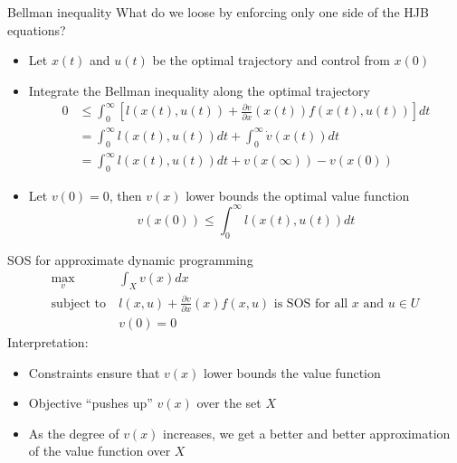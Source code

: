 \documentclass[aspectratio=169]{beamer}
\begin{document}
\begin{frame}{Bellman inequality}
What do we loose by enforcing only one side of the HJB equations?
\begin{itemize}
\item
Let $x(t)$ and $u(t)$ be the optimal trajectory and control from $x(0)$
\item
Integrate the Bellman inequality along the optimal trajectory
\begin{align*}
0 & \leq \int_0^\infty \left[ l(x(t), u(t)) + \frac{\partial v}{\partial x} (x(t)) f(x(t), u(t)) \right] dt \\
& = \int_0^\infty l(x(t), u(t)) dt + \int_0^\infty \dot v(x(t)) dt \\
& = \int_0^\infty l(x(t), u(t)) dt + v(x(\infty)) - v(x(0))
\end{align*}
\item
Let $v(0) = 0$, then $v(x)$ lower bounds the optimal value function
$$
v(x(0)) \leq \int_0^\infty l(x(t), u(t)) dt
$$
\end{itemize}
\end{frame}

\begin{frame}{SOS for approximate dynamic programming}
\begin{align*}
\max_v \ &\int_X v(x) dx \\
\text{subject to} \ & l(x, u) + \frac{\partial v}{\partial x} (x) f(x, u) \text{ is SOS for all } x \text{ and } u \in U \\
& v(0) = 0
\end{align*}
Interpretation:
\begin{itemize}
\item
Constraints ensure that $v(x)$ lower bounds the value function
\item
Objective ``pushes up'' $v(x)$ over the set $X$
\item
As the degree of $v(x)$ increases, we get a better and better approximation of the value function over $X$
\end{itemize}
\end{frame}
\end{document}
